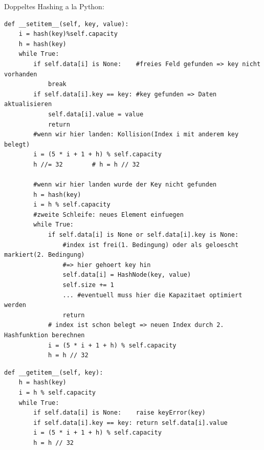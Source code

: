 \documentclass[11pt, fleqn]{scrreprt}
\begin{document}
Doppeltes Hashing a la Python:
\begin{verbatim}
def __setitem__(self, key, value):
    i = hash(key)%self.capacity
    h = hash(key)
    while True:
        if self.data[i] is None:    #freies Feld gefunden => key nicht vorhanden
            break
        if self.data[i].key == key: #key gefunden => Daten aktualisieren
            self.data[i].value = value
            return
        #wenn wir hier landen: Kollision(Index i mit anderem key belegt)
        i = (5 * i + 1 + h) % self.capacity
        h //= 32        # h = h // 32

        #wenn wir hier landen wurde der Key nicht gefunden
        h = hash(key)
        i = h % self.capacity
        #zweite Schleife: neues Element einfuegen
        while True:
            if self.data[i] is None or self.data[i].key is None:
                #index ist frei(1. Bedingung) oder als geloescht markiert(2. Bedingung)
                #=> hier gehoert key hin
                self.data[i] = HashNode(key, value)
                self.size += 1
                ... #eventuell muss hier die Kapazitaet optimiert werden
                return
            # index ist schon belegt => neuen Index durch 2. Hashfunktion berechnen
            i = (5 * i + 1 + h) % self.capacity
            h = h // 32
\end{verbatim}

\begin{verbatim}
def __getitem__(self, key):
    h = hash(key)
    i = h % self.capacity
    while True:
        if self.data[i] is None:    raise keyError(key)
        if self.data[i].key == key: return self.data[i].value
        i = (5 * i + 1 + h) % self.capacity
        h = h // 32
\end{verbatim}
\end{document}
